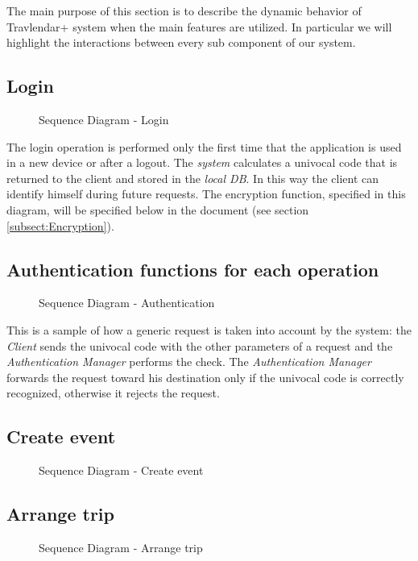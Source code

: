 The main purpose of this section is to describe the dynamic behavior of Travlendar+ system when the main features are utilized. In particular we will highlight the interactions between every sub component of our system.
\subsection{Login}
			\begin{figure}[H]
				\noindent{}
				\caption{Sequence Diagram - Login}
			\end{figure}
			The login operation is performed only the first time that the application is used in a new device or after a logout. 
			The \textit{system} calculates a univocal code that is returned to the client and stored in the \textit{local DB}. In this way the client can identify himself during future requests. 
			The encryption function, specified in this diagram, will be specified below in the document (see section \ref{subsect:Encryption}).
\subsection{Authentication functions for each operation}
	\begin{figure}[H]
		\noindent{}
	\caption{Sequence Diagram - Authentication}
	\end{figure}
		This is a sample of how a generic request is taken into account by the system: the \textit{Client} sends the univocal code with the other parameters of a request and the \textit{Authentication Manager} performs the check. 
		The \textit{Authentication Manager} forwards the request toward his destination only if the univocal code is correctly recognized, otherwise it rejects the request.
\subsection{Create event}
	\begin{figure}[H]
		\noindent{}
		\caption{Sequence Diagram - Create event}
	\end{figure}
\subsection{Arrange trip}
	\begin{figure}[H]
		\noindent{}
		\caption{Sequence Diagram - Arrange trip}
	\end{figure}
